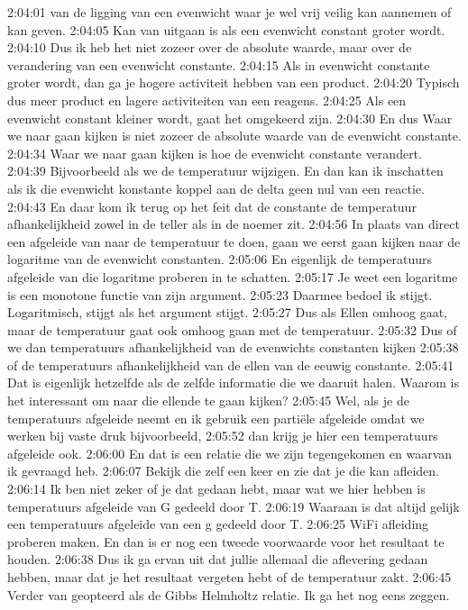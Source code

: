 2:04:01
van de ligging van een evenwicht waar je wel vrij veilig kan aannemen of kan geven.
2:04:05
Kan van uitgaan is als een evenwicht constant groter wordt.
2:04:10
Dus ik heb het niet zozeer over de absolute waarde, maar over de verandering van een evenwicht constante.
2:04:15
Als in evenwicht constante groter wordt, dan ga je hogere activiteit hebben van een product.
2:04:20
Typisch dus meer product en lagere activiteiten van een reagens.
2:04:25
Als een evenwicht constant kleiner wordt, gaat het omgekeerd zijn.
2:04:30
En dus Waar we naar gaan kijken is niet zozeer de absolute waarde van de evenwicht constante.
2:04:34
Waar we naar gaan kijken is hoe de evenwicht constante verandert.
2:04:39
Bijvoorbeeld als we de temperatuur wijzigen. En dan kan ik inschatten als ik die evenwicht konstante koppel aan de delta geen nul van een reactie.
2:04:43
En daar kom ik terug op het feit dat de constante de temperatuur afhankelijkheid zowel in de teller als in de noemer zit.
2:04:56
In plaats van direct een afgeleide van naar de temperatuur te doen, gaan we eerst gaan kijken naar de logaritme van de evenwicht constanten.
2:05:06
En eigenlijk de temperatuurs afgeleide van die logaritme proberen in te schatten.
2:05:17
Je weet een logaritme is een monotone functie van zijn argument.
2:05:23
Daarmee bedoel ik stijgt. Logaritmisch, stijgt als het argument stijgt.
2:05:27
Dus als Ellen omhoog gaat, maar de temperatuur gaat ook omhoog gaan met de temperatuur.
2:05:32
Dus of we dan temperatuurs afhankelijkheid van de evenwichts constanten kijken
2:05:38
of de temperatuurs afhankelijkheid van de ellen van de eeuwig constante.
2:05:41
Dat is eigenlijk hetzelfde als de zelfde informatie die we daaruit halen. Waarom is het interessant om naar die ellende te gaan kijken?
2:05:45
Wel, als je de temperatuurs afgeleide neemt en ik gebruik een partiële afgeleide omdat we werken bij vaste druk bijvoorbeeld,
2:05:52
dan krijg je hier een temperatuurs afgeleide ook.
2:06:00
En dat is een relatie die we zijn tegengekomen en waarvan ik gevraagd heb.
2:06:07
Bekijk die zelf een keer en zie dat je die kan afleiden.
2:06:14
Ik ben niet zeker of je dat gedaan hebt, maar wat we hier hebben is temperatuurs afgeleide van G gedeeld door T.
2:06:19
Waaraan is dat altijd gelijk een temperatuurs afgeleide van een g gedeeld door T.
2:06:25
WiFi afleiding proberen maken. En dan is er nog een tweede voorwaarde voor het resultaat te houden.
2:06:38
Dus ik ga ervan uit dat jullie allemaal die aflevering gedaan hebben, maar dat je het resultaat vergeten hebt of de temperatuur zakt.
2:06:45
Verder van geopteerd als de Gibbs Helmholtz relatie. Ik ga het nog eens zeggen.
